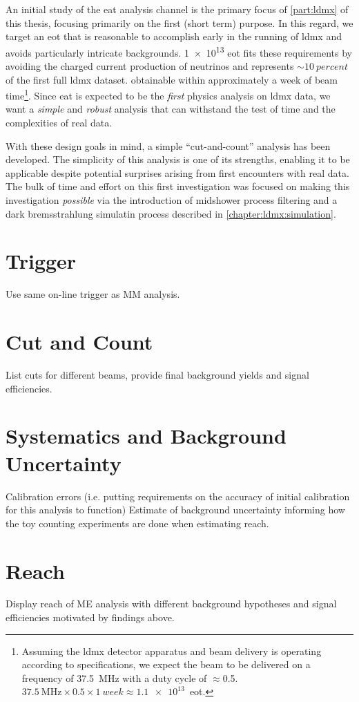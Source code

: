 An initial study of the \ac{eat} analysis channel is the primary focus of \cref{part:ldmx} of this thesis,
focusing primarily on the first (short term) purpose.
In this regard, we target an \ac{eot} that is reasonable
to accomplish early in the running of \ac{ldmx} and avoids particularly intricate backgrounds.
\num{1e13} \ac{eot} fits these requirements by avoiding the charged current production
of neutrinos and represents $\sim\qty{10}{percent}$ of the first full \ac{ldmx} dataset.
obtainable within approximately a week of beam time\footnote{
	Assuming the \ac{ldmx} detector apparatus and beam delivery is operating according to specifications, we expect the beam to be delivered on a frequency of \qty{37.5}{\mega\hertz} with a duty cycle of $\approx$\num{0.5}.
	$\qty{37.5}{\mega\hertz}\times0.5\times\qty{1}{week}\approx\num{1.1e13}$~\ac{eot}.
}.
Since \ac{eat} is expected to be the \emph{first} physics
analysis on \ac{ldmx} data, we want a \emph{simple} and \emph{robust} analysis that can withstand
the test of time and the complexities of real data.

With these design goals in mind, a simple ``cut-and-count'' analysis has been developed.
The simplicity of this analysis is one of its strengths, enabling it to be applicable
despite potential surprises arising from first encounters with real data.
The bulk of time and effort on this first investigation was focused on making this
investigation \emph{possible} via the introduction of midshower process filtering
and a dark bremsstrahlung simulatin process described in \cref{chapter:ldmx:simulation}.

\section{Trigger}
Use same on-line trigger as MM analysis.

\section{Cut and Count}
List cuts for different beams, provide final background yields and signal efficiencies.


\section{Systematics and Background Uncertainty}
Calibration errors (i.e. putting requirements on the accuracy of initial calibration for this analysis to function)
Estimate of background uncertainty informing how the toy counting experiments are done when estimating reach.

\section{Reach}
Display reach of ME analysis with different background hypotheses and signal efficiencies
motivated by findings above.

